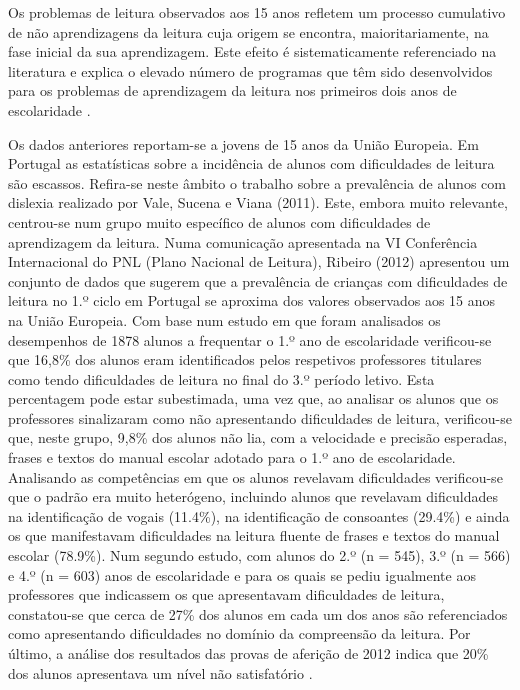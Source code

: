 \documentclass[
  oneside,
  11pt, a4paper,
  footinclude=true,
  headinclude=true,
  cleardoublepage=empty
]{scrbook}
\begin{document}
Os problemas de leitura observados aos 15 anos refletem um processo cumulativo de não aprendizagens da leitura cuja origem se encontra, maioritariamente, na fase inicial da sua aprendizagem. Este efeito é sistematicamente referenciado na literatura e explica o elevado número de programas que têm sido desenvolvidos para os problemas de  aprendizagem  da  leitura  nos  primeiros  dois  anos  de  escolaridade  \citep{European}.

Os dados anteriores reportam-se a jovens de 15 anos da União Europeia. Em Portugal as estatísticas sobre a incidência de alunos com dificuldades de leitura são escassos. Refira-se neste âmbito o trabalho sobre a prevalência de alunos com dislexia realizado por Vale, Sucena e Viana (2011). Este, embora muito relevante, centrou-se num grupo muito específico de alunos com dificuldades de aprendizagem da leitura. Numa comunicação  apresentada na VI Conferência Internacional do PNL (Plano Nacional de Leitura), Ribeiro (2012) apresentou um conjunto de dados que sugerem que a prevalência de crianças com dificuldades de leitura no 1.º ciclo em Portugal se aproxima dos valores observados aos 15 anos na União Europeia. Com base num estudo em que foram analisados os desempenhos de 1878 alunos a frequentar o 1.º ano de escolaridade verificou-se que 16,8\% dos alunos eram identificados pelos respetivos professores titulares como tendo dificuldades de leitura no final do 3.º período letivo. Esta percentagem pode estar subestimada, uma vez que, ao analisar os alunos que os professores sinalizaram como não apresentando dificuldades de leitura, verificou-se que, neste grupo, 9,8\% dos alunos não lia, com a velocidade e precisão esperadas, frases e textos do manual escolar adotado para o 1.º ano de escolaridade. Analisando as competências em que os alunos revelavam dificuldades verificou-se que o padrão era muito heterógeno, incluindo alunos que revelavam dificuldades na identificação de vogais (11.4\%), na identificação de consoantes (29.4\%) e ainda os que manifestavam dificuldades na leitura fluente de frases e textos do manual escolar (78.9\%). Num segundo estudo, com alunos do 2.º (n = 545), 3.º (n = 566) e 4.º (n = 603) anos de escolaridade e para os quais se pediu igualmente aos professores que indicassem os que apresentavam dificuldades de leitura, constatou-se que cerca de 27\% dos alunos em cada um dos anos são referenciados como apresentando dificuldades no domínio da compreensão da leitura. Por último, a análise dos resultados das provas de aferição de 2012 indica que 20\% dos alunos apresentava um nível não satisfatório \citep{Ribeiro2012}.
\end{document}
